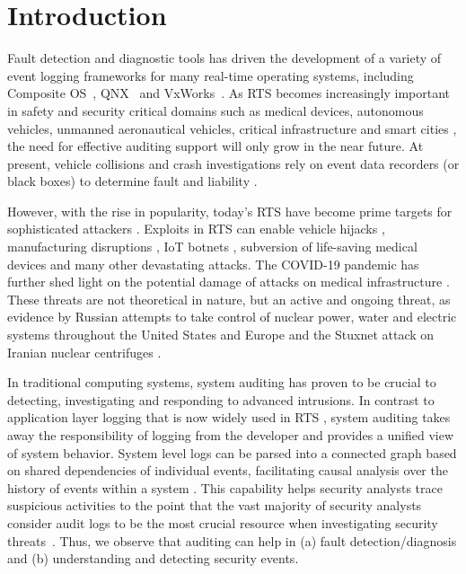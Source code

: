 \section{Introduction}
\label{sec:introduction}

Fault detection and diagnostic tools has driven the development of a variety of event logging frameworks for many real-time operating systems, including Composite OS~\cite{parmer2010composite,song2015c}, QNX~\cite{qnx_logging} and VxWorks~\cite{vxworks_logging}. As RTS becomes increasingly important in safety and security critical domains such as medical devices, autonomous vehicles, unmanned aeronautical vehicles, critical infrastructure and smart cities \cite{Rajkumar2010,lee2011challenges,gurgen2013self,monostori2016cyber}, the need for effective auditing support will only grow in the near future. At present, vehicle collisions and crash investigations rely on event data recorders (or black boxes) to determine fault and liability \cite{edr1,edr2,edr_blame1,edr_blame2}.

However, with the rise in popularity, today's RTS have become prime targets for sophisticated attackers \cite{dhs_cpssec}. Exploits in RTS can enable vehicle hijacks \cite{cps_article_6,cps_article_7}, manufacturing disruptions \cite{cps_article_8}, IoT botnets \cite{cps_article_5}, subversion of life-saving medical devices \cite{cps_article_4,cps_article_2} and many other devastating attacks. The COVID-19 pandemic has further shed light on the potential damage of attacks on medical infrastructure \cite{cps_article_3}. These threats are not theoretical in nature, but an active and ongoing threat, as evidence by Russian attempts to take control of nuclear power, water and electric systems throughout the United States and Europe \cite{Perlroth2018} and the Stuxnet attack on Iranian nuclear centrifuges \cite{Zetter2017}.
  
In traditional computing systems, system auditing has proven to be crucial to detecting, investigating and responding to advanced intrusions. In contrast to application layer logging that is now widely used in RTS \cite{parmer2010composite,qnx_logging,vxworks_logging,song2015c}, system auditing takes away the responsibility of logging from the developer and provides a unified view of system behavior. System level logs can be parsed into a connected graph based on shared dependencies of individual events, facilitating causal analysis over the history of events within a system \cite{King2003,Bates2015,Pei2016,Milajerdi2019,Ma2016}. This capability helps security analysts trace suspicious activities to the point that the vast majority of security analysts consider audit logs to be the most crucial resource when investigating security threats~\cite{Cimpanua}. Thus, we observe that auditing can help in (a) fault detection/diagnosis and (b) understanding and detecting security events.
 
